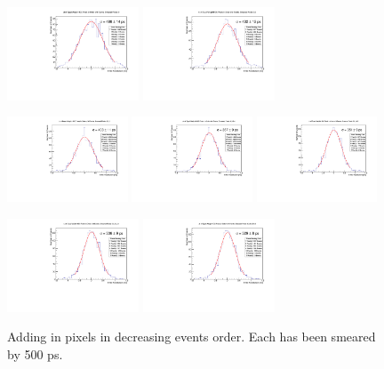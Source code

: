 \documentclass[twocolumn,aps,prd,reprint,superscriptaddress,floatfix]{revtex4-1}
\begin{document}
\begin{figure}[!htbp]
\centering
	\includegraphics[width=0.35\textwidth]{SKIROC_1_Pixels500.pdf}
	\includegraphics[width=0.35\textwidth]{SKIROC_2_Pixels500.pdf}
	
	\includegraphics[width=0.32\textwidth]{SKIROC_3_Pixels500.pdf}
	\includegraphics[width=0.32\textwidth]{SKIROC_4_Pixels500.pdf}
	\includegraphics[width=0.32\textwidth]{SKIROC_5_Pixels500.pdf}
	
	\includegraphics[width=0.35\textwidth]{SKIROC_6_Pixels500.pdf}
	\includegraphics[width=0.35\textwidth]{SKIROC_7_Pixels500.pdf}
	\caption{Adding in pixels in decreasing events order.
		Each has been smeared by 500 ps.}
	\label{fig:500psAll}
\end{figure}
\end{document}
